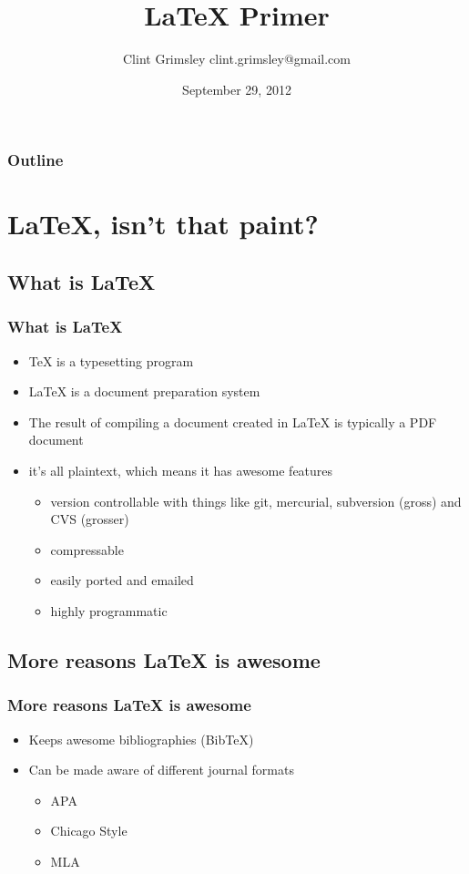 \documentclass{beamer}
\title{LaTeX Primer}
\author{Clint Grimsley clint.grimsley@gmail.com}
\date{September 29, 2012}
\begin{document}
\begin{frame}
\titlepage
\end{frame}

\begin{frame}
  \frametitle{Outline}
    \tableofcontents
\end{frame}

\section{LaTeX, isn't that paint?}
\subsection{What is LaTeX}

\begin{frame}
\frametitle{What is LaTeX}
\begin{itemize}
  \item TeX is a typesetting program
  \item LaTeX is a document preparation system
  \item The result of compiling a document created in LaTeX is typically a PDF document
  \item it's all plaintext, which means it has awesome features
    \begin{itemize}
      \item version controllable with things like git, mercurial, subversion (gross) and CVS (grosser)
      \item compressable
      \item easily ported and emailed
      \item highly programmatic
    \end{itemize}
\end{itemize}
\end{frame}

\subsection{More reasons LaTeX is awesome}
\begin{frame}
  \frametitle{More reasons LaTeX is awesome}
  \begin{itemize}
    \item Keeps awesome bibliographies (BibTeX)
    \item Can be made aware of different journal formats
      \begin{itemize}
        \item APA
        \item Chicago Style
        \item MLA
      \end{itemize}
  \end{itemize}
\end{frame}
\end{document}
